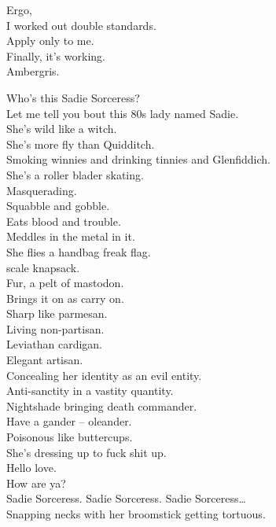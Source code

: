 Ergo, \\
I worked out double standards. \\
Apply only to me. \\
Finally, it's working. \\
Ambergris. \\




Who's this Sadie Sorceress? \\

Let me tell you bout this 80s lady named Sadie. \\
She's wild like a witch. \\
She's more fly than Quidditch. \\
Smoking winnies and drinking tinnies and Glenfiddich. \\
She's a roller blader skating. \\
Masquerading. \\
Squabble and gobble. \\
Eats blood and trouble. \\
Meddles in the metal in it. \\
She flies a handbag freak flag. \\
 scale knapsack. \\
Fur, a pelt of mastodon. \\
Brings it on as carry on. \\
Sharp like parmesan. \\
Living non-partisan. \\
Leviathan cardigan. \\
Elegant artisan. \\
Concealing her identity as an evil entity. \\
Anti-sanctity in a vastity quantity. \\
Nightshade bringing death commander. \\
Have a gander -- oleander. \\
Poisonous like buttercups. \\
She's dressing up to fuck shit up. \\

Hello love. \\
How are ya? \\

Sadie Sorceress. Sadie Sorceress. Sadie Sorceress… \\
Snapping necks with her broomstick getting tortuous. \\

